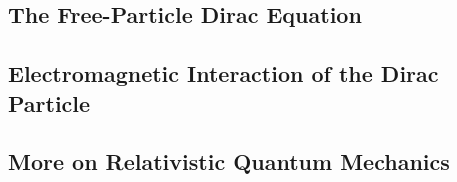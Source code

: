 \subsection{The Free-Particle Dirac Equation}

\subsection{Electromagnetic Interaction of the Dirac Particle}

\subsection{More on Relativistic Quantum Mechanics}
